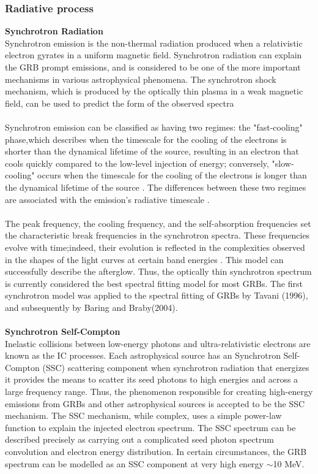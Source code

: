 \subsubsection{Radiative process}
\textbf{ Synchrotron Radiation}\\
Synchrotron emission is the non-thermal radiation produced when a relativistic
electron gyrates in a uniform magnetic field. Synchrotron radiation can explain
the GRB prompt emissions, and is considered to be one of the more important
mechanisms in various astrophysical phenomena. The synchrotron shock mechanism,
which is produced by the optically thin plasma in a weak magnetic field, can be
used to predict the form of the observed spectra \citep{1}\citep{15}\citep{18}\\\\
Synchrotron emission can be classified as having two regimes: the "fast-cooling"
phase,which describes when the timescale for the cooling of the electrons is shorter
than the dynamical lifetime of the source, resulting in an electron that cools quickly compared to the low-level injection of energy; conversely, "slow-cooling" occurs when the timescale for the cooling of the electrons is longer than the dynamical lifetime of the source . The differences between these two regimes are associated with the emission’s radiative timescale \citep{9} \citep{10}.\\\\
The peak frequency, the cooling frequency, and the self-absorption frequencies set
the characteristic break frequencies in the synchrotron spectra. These frequencies
evolve with time;indeed, their evolution is reflected in the complexities observed in
the shapes of the light curves at certain band energies . This model can successfully
describe the afterglow. Thus, the optically thin synchrotron spectrum is currently
considered the best spectral fitting model for most GRBs. The first synchrotron
model was applied to the spectral fitting of GRBs by Tavani (1996), and subsequently
by Baring and Braby(2004)\citep{15}\citep{16}.\\\\
\textbf{Synchrotron Self-Compton}\\
Inelastic collisions between low-energy photons and ultra-relativistic electrons are
known as the IC processes. Each astrophysical source has an Synchrotron Self-
Compton (SSC) scattering component when synchrotron radiation that energizes
it provides the means to scatter its seed photons to high energies and across a large
frequency range. Thus, the phenomenon responsible for creating high-energy emissions from GRBs and other astrophysical sources is accepted to be the SSC mechanism. The SSC mechanism, while complex, uses a simple power-law function to explain the injected electron spectrum. The SSC spectrum can be described precisely as carrying out a complicated seed photon spectrum convolution and electron energy distribution. In certain circumstances, the GRB spectrum can be modelled as an SSC component at very high energy $ \sim $10 MeV.\citep{11}\citep{16} 
